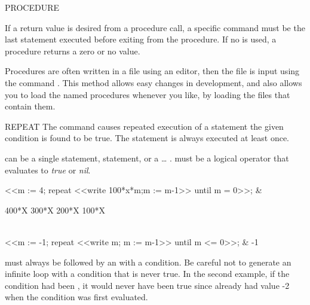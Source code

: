 \begin{Command}{PROCEDURE}
\begin{Comments}
If a return value is desired from a procedure call, a specific
 command must be the last statement executed before exiting
from the procedure.  If no  is used, a procedure returns a
zero or no value.

Procedures are often written in a file using an editor, then the file
is input using the command .  This method allows easy changes in
development, and also allows you to load the named procedures whenever
you like, by loading the files that contain them.
\end{Comments}
\end{Command}


\begin{Command}{REPEAT}
The  command causes repeated execution of a statement 
the given  condition is found to be true.  The statement is always executed
at least once.
\begin{Syntax}
   
\end{Syntax}

 can be a single statement,  statement, or
a \ldots{} .   must be 
a logical operator that evaluates to {\it true} or {\it nil}.

\begin{Examples}
<<m := 4; repeat <<write 100*x*m;m := m-1>> until m = 0>>;
			     & \begin{multilineoutput}{6cm}
400*X
300*X
200*X
100*X
\end{multilineoutput}\\

<<m := -1; repeat <<write m; m := m-1>> until m <= 0>>;
			     &           -1

\end{Examples}
\begin{Comments}
 must always be followed by an  with a condition.
Be careful not to generate an infinite loop with a condition that is never
true.  In the second example, if the condition had been , it
would never have been true since  already had value -2 when the
condition was first evaluated.
\end{Comments}
\end{Command}


